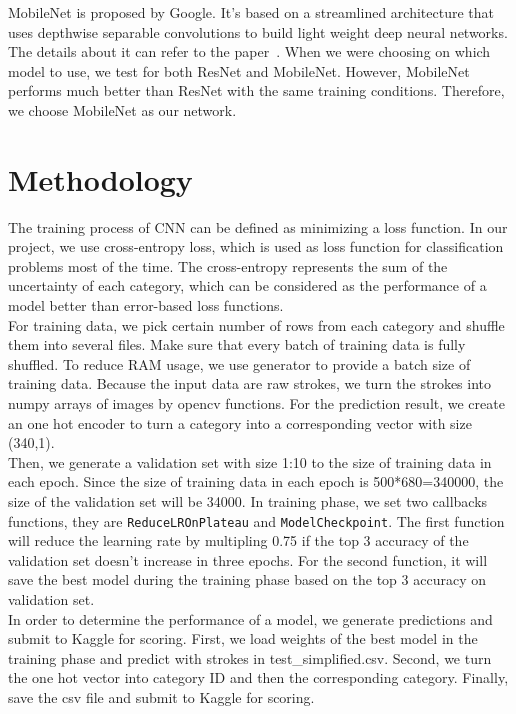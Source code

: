 \documentclass[10pt,twocolumn,letterpaper]{article}
\begin{document}
MobileNet is proposed by Google. 
It's based on a streamlined architecture that uses depthwise separable convolutions to build light weight deep neural networks.
The details about it can refer to the paper~\cite{MobileNet}.
When we were choosing on which model to use, we test for both ResNet and MobileNet.
However, MobileNet performs much better than ResNet with the same training conditions.
Therefore, we choose MobileNet as our network.


\section{Methodology}
The training process of CNN can be defined as minimizing a loss function. In our project,
we use cross-entropy loss, which is used as loss function for classification problems most of the time.
The cross-entropy represents the sum of the uncertainty of each category, 
which can be considered as the performance of a model better than error-based loss functions. \\

For training data, we pick certain number of rows from each category and shuffle them into several files. 
Make sure that every batch of training data is fully shuffled. 
To reduce RAM usage, we use generator to provide a batch size of training data. 
Because the input data are raw strokes, 
we turn the strokes into numpy arrays of images by opencv functions. For the prediction result,
we create an one hot encoder to turn a category into a corresponding vector with size (340,1). \\

Then, we generate a validation set with size 1:10 to the size of training data in each epoch.
Since the size of training data in each epoch is 500*680=340000, 
the size of the validation set will be 34000. 
In training phase, we set two callbacks functions, they are \verb|ReduceLROnPlateau| and \verb|ModelCheckpoint|.
The first function will reduce the learning rate by multipling 0.75 if the top 3 accuracy 
of the validation set doesn't increase in three epochs. For the second function,
it will save the best model during the training phase based on the top 3 accuracy on validation set. \\

In order to determine the performance of a model, we generate predictions and submit to Kaggle for scoring.
First, we load weights of the best model in the training phase and predict with strokes in test\_simplified.csv.
Second, we turn the one hot vector into category ID and then the corresponding category.
Finally, save the csv file and submit to Kaggle for scoring.
\end{document}
